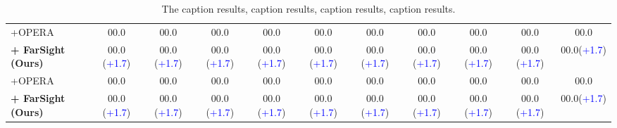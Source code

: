 \documentclass[letterpaper]{article} %
\begin{document}
\begin{table}[ht!]
{\begin{tabular}{l||ccc|cc|ccccc}
            \hdashline
            +OPERA    &00.0 &00.0 &00.0 &00.0 &00.0 &00.0 &00.0 &00.0 &00.0 &00.0\\
            \cellcolor{gray!20}\textbf{+ FarSight (Ours)}  &\cellcolor{gray!20}00.0 (\textcolor{blue}{+1.7}) &\cellcolor{gray!20}00.0 (\textcolor{blue}{+1.7})&\cellcolor{gray!20}00.0 (\textcolor{blue}{+1.7})&\cellcolor{gray!20}00.0 (\textcolor{blue}{+1.7})&\cellcolor{gray!20}00.0 (\textcolor{blue}{+1.7})&\cellcolor{gray!20}00.0 (\textcolor{blue}{+1.7})&\cellcolor{gray!20}00.0 (\textcolor{blue}{+1.7})&\cellcolor{gray!20}00.0 (\textcolor{blue}{+1.7})&\cellcolor{gray!20}00.0 (\textcolor{blue}{+1.7})&\cellcolor{gray!20}00.0(\textcolor{blue}{+1.7})\\
            \hdashline
            +OPERA    &00.0 &00.0 &00.0 &00.0 &00.0 &00.0 &00.0 &00.0 &00.0 &00.0\\
            \cellcolor{gray!20}\textbf{+ FarSight (Ours)}  &\cellcolor{gray!20}00.0 (\textcolor{blue}{+1.7}) &\cellcolor{gray!20}00.0 (\textcolor{blue}{+1.7})&\cellcolor{gray!20}00.0 (\textcolor{blue}{+1.7})&\cellcolor{gray!20}00.0 (\textcolor{blue}{+1.7})&\cellcolor{gray!20}00.0 (\textcolor{blue}{+1.7})&\cellcolor{gray!20}00.0 (\textcolor{blue}{+1.7})&\cellcolor{gray!20}00.0 (\textcolor{blue}{+1.7})&\cellcolor{gray!20}00.0 (\textcolor{blue}{+1.7})&\cellcolor{gray!20}00.0 (\textcolor{blue}{+1.7})&\cellcolor{gray!20}00.0(\textcolor{blue}{+1.7})\\
             \bottomrule
       \end{tabular}
   }
   \caption{The caption results, caption results, caption results, caption results.}
\end{table}
\end{document}
